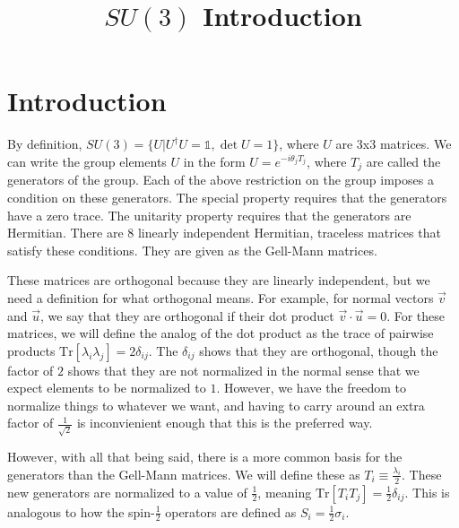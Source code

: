 \documentclass[12pt]{article}
\newcommand{\Tr}[1]{\text{Tr}[#1]}
\renewcommand{\exp}[1]{e^{#1}}
\newcommand{\aside}[2]{#1}
\begin{document}
 
\title{$SU(3)$ Introduction}
\author{}
\date{}

\maketitle

\section{Introduction}
By definition, $SU(3)=\{U|U^\dagger U = \mathbb{1},\det{U}=1\}$, where $U$ are 3x3 matrices. We can write the group elements $U$ in the form $U=\exp{-i \theta_j T_j}$, where $T_j$ are called the generators of the group. Each of the above restriction on the group imposes a condition on these generators. The \aside{special}{Special means that $\det{U}=1$} property requires that the \aside{generators have a zero trace}{Proof}. The \aside{unitarity}{Unitary means $U^\dagger U=\mathbb{1}$} property requires that the \aside{generators are Hermitian}{Proof}. There are \aside{8 linearly independent Hermitian, traceless matrices}{Discussion on degrees of freedom and why there are 8} that satisfy these conditions. They are given as the Gell-Mann matrices.
\begin{equation}
\end{equation}

These matrices are orthogonal because they are linearly independent, but we need a definition for what orthogonal means. For example, for normal vectors $\vec{v}$ and $\vec{u}$, we say that they are orthogonal if their dot product $\vec{v}\cdot\vec{u}=0$. For these matrices, we will define the analog of the dot product as the trace of pairwise products $\Tr{\lambda_i\lambda_j}=2\delta_{ij}$. The $\delta_{ij}$ shows that they are orthogonal, though the factor of $2$ shows that they are not normalized in the normal sense that we expect elements to be normalized to $1$. However, we have the freedom to normalize things to whatever we want, and having to carry around an extra factor of $\frac{1}{\sqrt{2}}$ is inconvienient enough that this is the preferred way.

However, with all that being said, there is a more common basis for the generators than the Gell-Mann matrices. We will define these as $T_i\equiv \frac{\lambda_i}{2}$. These new generators are normalized to a value of $\frac{1}{2}$, meaning $\Tr{T_i T_j}=\frac{1}{2}\delta_{ij}$. This is analogous to how the spin-$\frac{1}{2}$ operators are defined as $S_i=\frac{1}{2}\sigma_i$.
\end{document}
